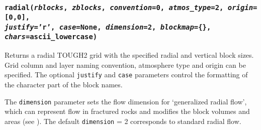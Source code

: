 \begin{snugshade}
\subsubsection{\texttt{radial(\emph{rblocks}, \emph{zblocks}, \emph{convention}=0, \emph{atmos\_type}=2, \emph{origin}=[0,0],\\
    \emph{justify}='r', \emph{case}=None, \emph{dimension}=2, \emph{blockmap}=\{\}, \emph{chars}=ascii\_lowercase)}}
\end{snugshade}
\label{sec:t2grid:radial}

Returns a radial TOUGH2 grid with the specified radial and vertical block sizes.  Grid column and layer naming convention, atmosphere type and origin can be specified.  The optional \texttt{justify} and \texttt{case} parameters control the formatting of the character part of the block names.

The \texttt{dimension} parameter sets the flow dimension for `generalized radial flow', which can represent flow in fractured rocks and modifies the block volumes and areas (see \cite{barker_1988}).  The default \texttt{dimension} = 2 corresponds to standard radial flow.

